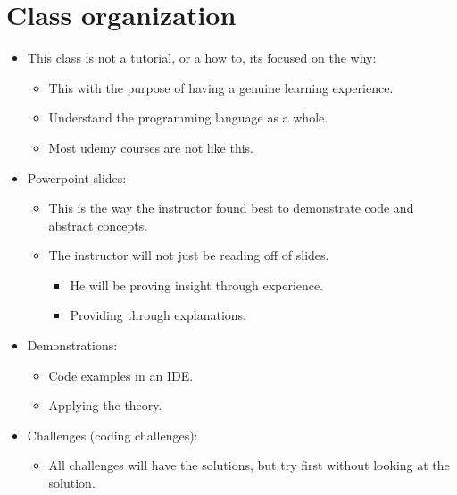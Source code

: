 \section{Class organization}
\begin{itemize}
    \item This class is not a tutorial, or a how to, its focused on the why:
        \begin{itemize}
            \item This with the purpose of having a genuine learning experience.
            \item Understand the programming language as a whole.
            \item Most udemy courses are not like this.
        \end{itemize}
    
    \item Powerpoint slides: 
        \begin{itemize}
            \item This is the way the instructor found best to demonstrate code and abstract concepts.
            \item The instructor will not just be reading off of slides.
                \begin{itemize}
                    \item He will be proving insight through experience.
                    \item Providing through explanations.
                \end{itemize}
        \end{itemize}
    
    \item Demonstrations:
        \begin{itemize}
            \item Code examples in an IDE.
            \item Applying the theory.
        \end{itemize}
    
    \item Challenges (coding challenges):
        \begin{itemize}
            \item All challenges will have the solutions, but try first without looking at the solution.
        \end{itemize}
\end{itemize}

